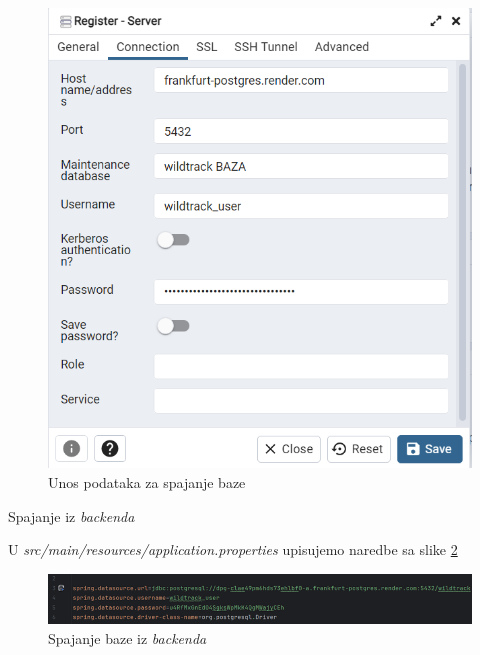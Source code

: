 \begin{packed_enum}
			\begin{figure}[H]
				\includegraphics[scale=1]{slike/postavljanje baze3.png}
				\centering
				\caption{Unos podataka za spajanje baze}
				\label{fig:postavljanje baze3}
			\end{figure}

			\item Spajanje iz \textit{backenda}
			\begin{packed_item}
				\item U \textit{src/main/resources/application.properties} upisujemo naredbe sa slike \ref{fig:postavljanje baze4}
			\end{packed_item}
			
			\begin{figure}[H]
				\includegraphics[scale=1]{slike/postavljanje baze4.png}
				\centering
				\caption{Spajanje baze iz \textit{backenda}}
				\label{fig:postavljanje baze4}
			\end{figure}


			\end{packed_enum}
			
			\eject 